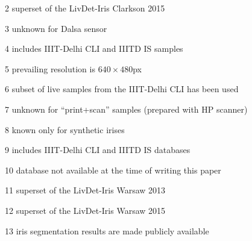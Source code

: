 \documentclass[format=acmsmall, review=false, timestamp=false]{acmart}
\begin{document}
\begin{landscape}
\begin{table}[htb!]
\begin{center}
\begin{threeparttable}
\begin{tablenotes}
\begin{minipage}{0.5\textwidth}
			\item[2] superset of the {\sf LivDet-Iris Clarkson 2015}
			\item[3] unknown for Dalsa sensor
		\end{minipage}
		\begin{minipage}{0.5\textwidth}
		\tiny
		    \item
		    \item[4] includes {\sf IIIT-Delhi CLI} and {\sf IIITD IS} samples
		    \item[5] prevailing resolution is $640\times480$px
			\item[6] subset of live samples from the {\sf IIIT-Delhi CLI} has been used		    
			\item[7] unknown for ``print+scan'' samples (prepared with HP scanner)
			\item[8] known only for synthetic irises
		\end{minipage}\hfill
		\begin{minipage}{0.5\textwidth}
		\tiny
		    \item
		    \item
			\item[9] includes {\sf IIIT-Delhi CLI} and {\sf IIITD IS} databases
			\item[10] database not available at the time of writing this paper
			\item[11] superset of the {\sf LivDet-Iris Warsaw 2013}
			\item[12] superset of the {\sf LivDet-Iris Warsaw 2015}
			\item[13] iris segmentation results are made publicly available
		\end{minipage}\hfill		
		\end{tablenotes}
	\end{threeparttable}	
    \end{center}
\end{table}
\end{landscape}
\end{document}
